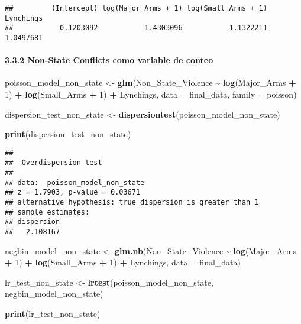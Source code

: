 \documentclass[
  11pt,
]{article}
\newenvironment{Shaded}{\begin{snugshade}}{\end{snugshade}}
\newcommand{\AttributeTok}[1]{\textcolor[rgb]{0.13,0.29,0.53}{#1}}
\newcommand{\DecValTok}[1]{\textcolor[rgb]{0.00,0.00,0.81}{#1}}
\newcommand{\FunctionTok}[1]{\textcolor[rgb]{0.13,0.29,0.53}{\textbf{#1}}}
\newcommand{\NormalTok}[1]{#1}
\newcommand{\OtherTok}[1]{\textcolor[rgb]{0.56,0.35,0.01}{#1}}
\newcommand{\SpecialCharTok}[1]{\textcolor[rgb]{0.81,0.36,0.00}{\textbf{#1}}}
\begin{document}
\begin{verbatim}
##         (Intercept) log(Major_Arms + 1) log(Small_Arms + 1)           Lynchings 
##           0.1203092           1.4303096           1.1322211           1.0497681
\end{verbatim}

\paragraph{3.3.2 Non-State Conflicts como variable de
conteo}\label{non-state-conflicts-como-variable-de-conteo}

\begin{Shaded}
\begin{Highlighting}[]
\NormalTok{poisson\_model\_non\_state }\OtherTok{\textless{}{-}} \FunctionTok{glm}\NormalTok{(Non\_State\_Violence }\SpecialCharTok{\textasciitilde{}} \FunctionTok{log}\NormalTok{(Major\_Arms }\SpecialCharTok{+} \DecValTok{1}\NormalTok{) }\SpecialCharTok{+} \FunctionTok{log}\NormalTok{(Small\_Arms }\SpecialCharTok{+} \DecValTok{1}\NormalTok{) }\SpecialCharTok{+}\NormalTok{ Lynchings,                                 }\AttributeTok{data =}\NormalTok{ final\_data, }\AttributeTok{family =}\NormalTok{ poisson)}

\NormalTok{dispersion\_test\_non\_state }\OtherTok{\textless{}{-}} \FunctionTok{dispersiontest}\NormalTok{(poisson\_model\_non\_state)}

\FunctionTok{print}\NormalTok{(dispersion\_test\_non\_state)}
\end{Highlighting}
\end{Shaded}

\begin{verbatim}
## 
##  Overdispersion test
## 
## data:  poisson_model_non_state
## z = 1.7903, p-value = 0.03671
## alternative hypothesis: true dispersion is greater than 1
## sample estimates:
## dispersion 
##   2.108167
\end{verbatim}

\begin{Shaded}
\begin{Highlighting}[]
\NormalTok{negbin\_model\_non\_state }\OtherTok{\textless{}{-}} \FunctionTok{glm.nb}\NormalTok{(Non\_State\_Violence }\SpecialCharTok{\textasciitilde{}} \FunctionTok{log}\NormalTok{(Major\_Arms }\SpecialCharTok{+} \DecValTok{1}\NormalTok{) }\SpecialCharTok{+} \FunctionTok{log}\NormalTok{(Small\_Arms }\SpecialCharTok{+} \DecValTok{1}\NormalTok{) }\SpecialCharTok{+}\NormalTok{ Lynchings,                                   }\AttributeTok{data =}\NormalTok{ final\_data) }

\NormalTok{lr\_test\_non\_state }\OtherTok{\textless{}{-}} \FunctionTok{lrtest}\NormalTok{(poisson\_model\_non\_state, negbin\_model\_non\_state)}

\FunctionTok{print}\NormalTok{(lr\_test\_non\_state) }
\end{Highlighting}
\end{Shaded}
\end{document}
